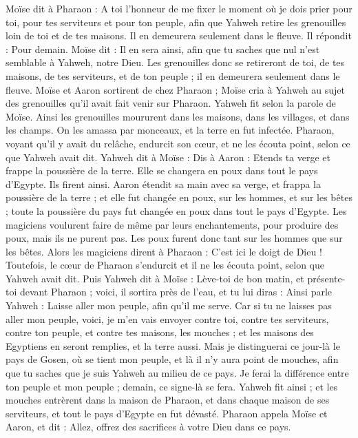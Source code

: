\begin{multicols}{2}
Moïse dit à Pharaon : A toi l’honneur de me fixer le moment où je dois prier pour toi, pour tes serviteurs et pour ton peuple, afin que Yahweh retire les grenouilles loin de toi et de tes maisons. Il en demeurera seulement dans le fleuve.
Il répondit : Pour demain. Moïse dit : Il en sera ainsi, afin que tu saches que nul n’est semblable à Yahweh, notre Dieu.
Les grenouilles donc se retireront de toi, de tes maisons, de tes serviteurs, et de ton peuple ; il en demeurera seulement dans le fleuve.
Moïse et Aaron sortirent de chez Pharaon ; Moïse cria à Yahweh au sujet des grenouilles qu'il avait fait venir sur Pharaon.
Yahweh fit selon la parole de Moïse. Ainsi les grenouilles moururent dans les maisons, dans les villages, et dans les champs.
On les amassa par monceaux, et la terre en fut infectée.
Pharaon, voyant qu'il y avait du relâche, endurcit son cœur, et ne les écouta point, selon ce que Yahweh avait dit.
Yahweh dit à Moïse : Dis à Aaron : Etends ta verge et frappe la poussière de la terre. Elle se changera en poux dans tout le pays d'Egypte.
Ils firent ainsi. Aaron étendit sa main avec sa verge, et frappa la poussière de la terre ; et elle fut changée en poux, sur les hommes, et sur les bêtes ; toute la poussière du pays fut changée en poux dans tout le pays d'Egypte.
Les magiciens voulurent faire de même par leurs enchantements, pour produire des poux, mais ils ne purent pas. Les poux furent donc tant sur les hommes que sur les bêtes.
Alors les magiciens dirent à Pharaon : C'est ici le doigt de Dieu\FTNT{} ! Toutefois, le cœur de Pharaon s'endurcit et il ne les écouta point, selon que Yahweh avait dit.
Puis Yahweh dit à Moïse : Lève-toi de bon matin, et présente-toi devant Pharaon ; voici, il sortira près de l'eau, et tu lui diras : Ainsi parle Yahweh : Laisse aller mon peuple, afin qu'il me serve.
Car si tu ne laisses pas aller mon peuple, voici, je m'en vais envoyer contre toi, contre tes serviteurs, contre ton peuple, et contre tes maisons, les mouches ; et les maisons des Egyptiens en seront remplies, et la terre aussi\FTNT{}.
Mais je distinguerai ce jour-là le pays de Gosen, où se tient mon peuple, et là il n’y aura point de mouches, afin que tu saches que je suis Yahweh au milieu de ce pays.
Je ferai la différence entre ton peuple et mon peuple ; demain, ce signe-là se fera.
Yahweh fit ainsi ; et les mouches entrèrent dans la maison de Pharaon, et dans chaque maison de ses serviteurs, et tout le pays d'Egypte en fut dévasté.
Pharaon appela Moïse et Aaron, et dit : Allez, offrez des sacrifices à votre Dieu dans ce pays.

\end{multicols}
